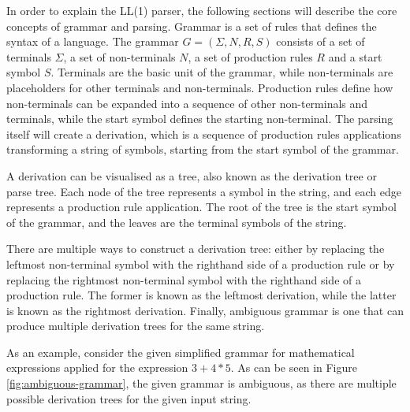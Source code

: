 In order to explain the LL(1) parser, the following sections will describe the core concepts of grammar and parsing. Grammar is a set of rules that defines the syntax of a language. The grammar $G = (\Sigma, N, R, S)$ consists of a set of terminals $\Sigma$, a set of non-terminals $N$, a set of production rules $R$ and a start symbol $S$. Terminals are the basic unit of the grammar, while non-terminals are placeholders for other terminals and non-terminals. Production rules define how non-terminals can be expanded into a sequence of other non-terminals and terminals, while the start symbol defines the starting non-terminal. The parsing itself will create a derivation, which is a sequence of production rules applications transforming a string of symbols, starting from the start symbol of the grammar.

A derivation can be visualised as a tree, also known as the derivation tree or parse tree. Each node of the tree represents a symbol in the string, and each edge represents a production rule application. The root of the tree is the start symbol of the grammar, and the leaves are the terminal symbols of the string.

There are multiple ways to construct a derivation tree: either by replacing the leftmost non-terminal symbol with the righthand side of a production rule or by replacing the rightmost non-terminal symbol with the righthand side of a production rule. The former is known as the leftmost derivation, while the latter is known as the rightmost derivation. Finally, ambiguous grammar is one that can produce multiple derivation trees for the same string.

\clearpage

As an example, consider the given simplified grammar for mathematical expressions applied for the expression $3 + 4 * 5$. As can be seen in Figure \ref{fig:ambiguous-grammar}, the given grammar is ambiguous, as there are multiple possible derivation trees for the given input string.

